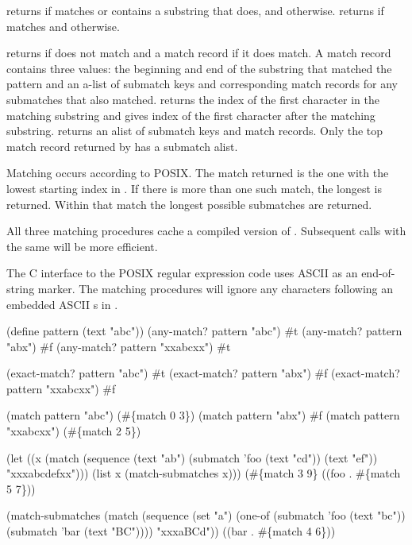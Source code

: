 \begin{protos}
\end{protos}
\noindent
{} returns  if  matches  or
 contains a substring that does, and  otherwise.
 returns  if  matches
  and  otherwise.

 returns  if  does not match 
 and a match record if it does match.
A match record contains three values: the beginning and end of the substring
 that matched
 the pattern and an a-list of submatch keys and corresponding match records
 for any submatches that also matched.
 returns the index of
 the first character in the matching substring and  gives index
 of the first character after the matching substring.
 returns an alist of submatch keys and match records.
Only the top match record returned by  has a submatch alist.

Matching occurs according to POSIX.
The match returned is the one with the lowest starting index in .
If there is more than one such match, the longest is returned.
Within that match the longest possible submatches are returned.

All three matching procedures cache a compiled version of .
Subsequent calls with the same  will be more efficient.

The C interface to the POSIX regular expression code uses ASCII 
 as an end-of-string marker.
The matching procedures will ignore any characters following an
 embedded ASCII s in .

\begin{example}
(define pattern (text "abc"))
(any-match? pattern "abc")         \evalsto #t
(any-match? pattern "abx")         \evalsto #f
(any-match? pattern "xxabcxx")     \evalsto #t

(exact-match? pattern "abc")       \evalsto #t
(exact-match? pattern "abx")       \evalsto #f
(exact-match? pattern "xxabcxx")   \evalsto #f

(match pattern "abc")              \evalsto (#\{match 0 3\})
(match pattern "abx")              \evalsto #f
(match pattern "xxabcxx")          \evalsto (#\{match 2 5\})

(let ((x (match (sequence (text "ab")
                          (submatch 'foo (text "cd"))
                          (text "ef"))
                "xxxabcdefxx")))
  (list x (match-submatches x)))
  \evalsto (#\{match 3 9\} ((foo . #\{match 5 7\}))

(match-submatches
  (match (sequence
           (set "a")
           (one-of (submatch 'foo (text "bc"))
                   (submatch 'bar (text "BC"))))
         "xxxaBCd"))
  \evalsto ((bar . #\{match 4 6\}))
\end{example}

